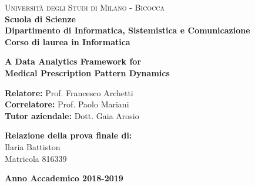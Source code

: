 \documentclass[a4paper, 12pt, twoside]{report}
\begin{document}
	
	\begin{titlepage}
		
		\begin{minipage}[t]{0.19\textwidth}
		\end{minipage}
		\begin{minipage}[t]{0.81\textwidth}
			{
				{\textsc{Università degli Studi di Milano - Bicocca}} \\
				\textbf{Scuola di Scienze} \\
				\textbf{Dipartimento di Informatica, Sistemistica e Comunicazione} \\
				\textbf{Corso di laurea in Informatica} \\
				\par
			}
		\end{minipage}
		
		\vspace{40mm}
		
		\begin{center}
			{\LARGE{
					\textbf{A Data Analytics Framework for \\Medical Prescription Pattern Dynamics}
					\par
			}}
		\end{center}
		
		\vspace{40mm}
		
		{\large \textbf{Relatore:} Prof. Francesco Archetti \medskip} \\
		{\large \textbf{Correlatore:} Prof. Paolo Mariani \medskip} \\
		{\large \textbf{Tutor aziendale:} Dott. Gaia Arosio \medskip} \\
		
		\vspace{15mm}
		
		\begin{flushright}
			{\large \textbf{Relazione della prova finale di:}} \\
			\large{Ilaria Battiston} \\
			\large{Matricola 816339} 
		\end{flushright}
		
		\vspace{30mm}
		\begin{center}
			{\large{\bf Anno Accademico 2018-2019}}
		\end{center}
		
		\restoregeometry
		
	\end{titlepage}
    
\end{document}
